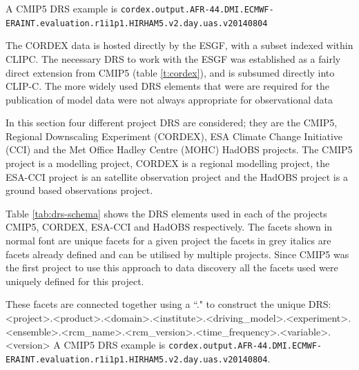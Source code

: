 \documentclass[final,1p,times,twocolumn,authoryear]{elsarticle}
\begin{document}
A CMIP5 DRS example is \newline 
\small{\texttt{cordex.output.AFR-44.DMI.ECMWF-ERAINT.evaluation.r1i1p1.HIRHAM5.v2.day.uas.v20140804}}

The CORDEX data is hosted directly by the ESGF, with a subset indexed within CLIPC. The necessary DRS to work with the ESGF was established as a fairly direct extension from CMIP5 (table \ref{t:cordex}), and is subsumed directly into CLIP-C.
The more widely used DRS elements that were are required for the publication of model data were not always appropriate for observational data

In this section four different project DRS are considered; they are the CMIP5, Regional Downscaling Experiment (CORDEX), ESA Climate Change Initiative (CCI) and the Met Office Hadley Centre (MOHC) HadOBS projects. The CMIP5 project is a modelling project, CORDEX is a regional modelling project, the ESA-CCI project is an satellite observation project and the HadOBS project is a ground based observations project.  


Table \ref{tab:drs-schema} shows the DRS elements used in each of the projects CMIP5, CORDEX, ESA-CCI and HadOBS respectively. The facets shown in normal font are unique facets for a given project the facets in grey italics are facets already defined and can be utilised by multiple projects. Since CMIP5 was the first project to use this approach to data discovery all the facets used were uniquely defined for this project. 

These facets are connected together using a ``." to construct the unique DRS: 
\textless{}project\textgreater{}.\textless{}product\textgreater{}.\textless{}domain\textgreater{}.\textless{}institute\textgreater{}.\textless{}driving\_model\textgreater{}.\textless{}experiment\textgreater{}.\textless{}ensemble\textgreater{}.\newline\textless{}rcm\_name\textgreater{}.\textless{}rcm\_version\textgreater{}.\textless{}time\_frequency\textgreater{}.\textless{}variable\textgreater{}.\textless{}version\textgreater{}
A CMIP5 DRS example is \newline 
\small{\texttt{cordex.output.AFR-44.DMI.ECMWF-ERAINT.evaluation.r1i1p1.HIRHAM5.v2.day.uas.v20140804}}.
\normalsize
\end{document}
